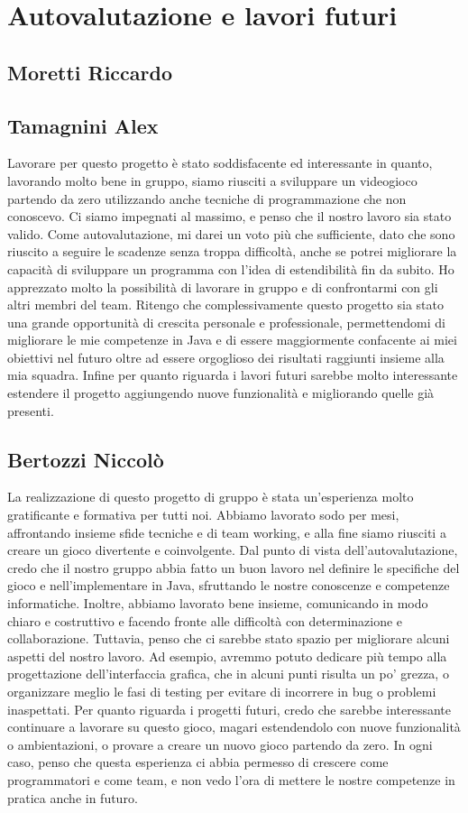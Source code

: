 \documentclass[a4paper,12pt]{report}
\begin{document}
\section{Autovalutazione e lavori futuri}
\subsection*{Moretti Riccardo}

\subsection*{Tamagnini Alex}
Lavorare per questo progetto è stato soddisfacente ed interessante in quanto, lavorando molto bene in gruppo, siamo riusciti a sviluppare un videogioco partendo da zero utilizzando anche tecniche di programmazione che non conoscevo. Ci siamo impegnati al massimo, e penso che il nostro lavoro sia stato valido.
Come autovalutazione, mi darei un voto più che sufficiente, dato che sono riuscito a seguire le scadenze senza troppa difficoltà, anche se potrei migliorare la capacità di sviluppare un programma con l'idea di estendibilità fin da subito.
Ho apprezzato molto la possibilità di lavorare in gruppo e di confrontarmi con gli altri membri del team. Ritengo che complessivamente questo progetto sia stato una grande opportunità di crescita personale e professionale, permettendomi di migliorare le mie competenze in Java e di essere maggiormente confacente ai miei obiettivi nel futuro oltre ad essere orgoglioso dei risultati raggiunti insieme alla mia squadra.
Infine per quanto riguarda i lavori futuri sarebbe molto interessante estendere il progetto aggiungendo nuove funzionalità e migliorando quelle già presenti.

\subsection*{Bertozzi Niccolò}
La realizzazione di questo progetto di gruppo è stata un'esperienza molto gratificante e formativa per tutti noi. Abbiamo lavorato sodo per mesi, affrontando insieme sfide tecniche e di team working, e alla fine siamo riusciti a creare un gioco divertente e coinvolgente.
Dal punto di vista dell'autovalutazione, credo che il nostro gruppo abbia fatto un buon lavoro nel definire le specifiche del gioco e nell'implementare in Java, sfruttando le nostre conoscenze e competenze informatiche. Inoltre, abbiamo lavorato bene insieme, comunicando in modo chiaro e costruttivo e facendo fronte alle difficoltà con determinazione e collaborazione.
Tuttavia, penso che ci sarebbe stato spazio per migliorare alcuni aspetti del nostro lavoro. Ad esempio, avremmo potuto dedicare più tempo alla progettazione dell'interfaccia grafica, che in alcuni punti risulta un po' grezza, o organizzare meglio le fasi di testing per evitare di incorrere in bug o problemi inaspettati.
Per quanto riguarda i progetti futuri, credo che sarebbe interessante continuare a lavorare su questo gioco, magari estendendolo con nuove funzionalità o ambientazioni, o provare a creare un nuovo gioco partendo da zero. In ogni caso, penso che questa esperienza ci abbia permesso di crescere come programmatori e come team, e non vedo l'ora di mettere le nostre competenze in pratica anche in futuro.
\end{document}
